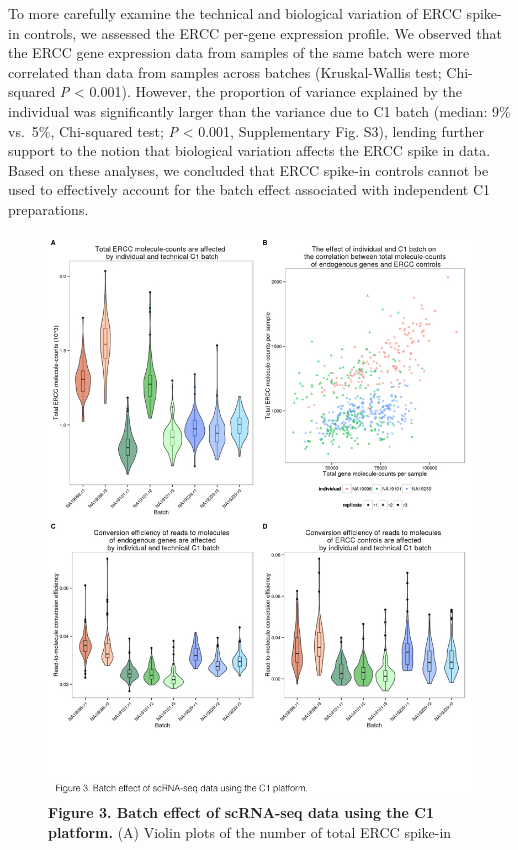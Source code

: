 To more carefully examine the technical and biological variation of ERCC
spike-in controls, we assessed the ERCC per-gene expression profile. We
observed that the ERCC gene expression data from samples of the same
batch were more correlated than data from samples across batches
(Kruskal-Wallis test; Chi-squared \emph{P} \textless{} 0.001). However,
the proportion of variance explained by the individual was significantly
larger than the variance due to C1 batch (median: 9\% vs.~5\%,
Chi-squared test; \emph{P} \textless{} 0.001, Supplementary Fig. S3),
lending further support to the notion that biological variation affects
the ERCC spike in data. Based on these analyses, we concluded that ERCC
spike-in controls cannot be used to effectively account for the batch
effect associated with independent C1 preparations.

\begin{figure}[htbp]
\centering
\includegraphics[width=5in]{img/ch04/Figure03.jpeg}
\caption{\textbf{Figure 3. Batch effect of scRNA-seq data using the C1
platform.} (A) Violin plots of the number of total ERCC spike-in
}
\end{figure}
